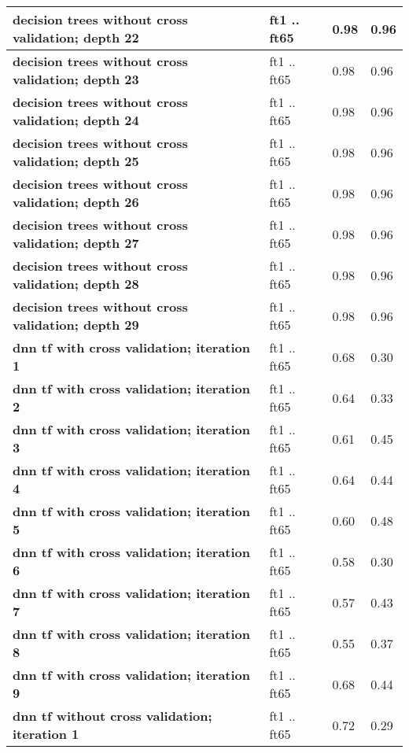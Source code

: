 \begin{tabular}{|l|p{1.2in}|p{0.9in}|p{0.9in}|}
     \hline
      \textbf{ decision trees without cross validation; depth 22 } &  ft1 .. ft65  &  0.98  &  0.96 \\
     \hline
      \textbf{ decision trees without cross validation; depth 23 } &  ft1 .. ft65  &  0.98  &  0.96 \\
     \hline
      \textbf{ decision trees without cross validation; depth 24 } &  ft1 .. ft65  &  0.98  &  0.96 \\
     \hline
      \textbf{ decision trees without cross validation; depth 25 } &  ft1 .. ft65  &  0.98  &  0.96 \\
     \hline
      \textbf{ decision trees without cross validation; depth 26 } &  ft1 .. ft65  &  0.98  &  0.96 \\
     \hline
      \textbf{ decision trees without cross validation; depth 27 } &  ft1 .. ft65  &  0.98  &  0.96 \\
     \hline
      \textbf{ decision trees without cross validation; depth 28 } &  ft1 .. ft65  &  0.98  &  0.96 \\
     \hline
      \textbf{ decision trees without cross validation; depth 29 } &  ft1 .. ft65  &  0.98  &  0.96 \\
     \hline
      \textbf{ dnn tf with cross validation; iteration 1 } &  ft1 .. ft65  &  0.68  &  0.30 \\
     \hline
      \textbf{ dnn tf with cross validation; iteration 2 } &  ft1 .. ft65  &  0.64  &  0.33 \\
     \hline
      \textbf{ dnn tf with cross validation; iteration 3 } &  ft1 .. ft65  &  0.61  &  0.45 \\
     \hline
      \textbf{ dnn tf with cross validation; iteration 4 } &  ft1 .. ft65  &  0.64  &  0.44 \\
     \hline
      \textbf{ dnn tf with cross validation; iteration 5 } &  ft1 .. ft65  &  0.60  &  0.48 \\
     \hline
      \textbf{ dnn tf with cross validation; iteration 6 } &  ft1 .. ft65  &  0.58  &  0.30 \\
     \hline
      \textbf{ dnn tf with cross validation; iteration 7 } &  ft1 .. ft65  &  0.57  &  0.43 \\
     \hline
      \textbf{ dnn tf with cross validation; iteration 8 } &  ft1 .. ft65  &  0.55  &  0.37 \\
     \hline
      \textbf{ dnn tf with cross validation; iteration 9 } &  ft1 .. ft65  &  0.68  &  0.44 \\
     \hline
      \textbf{ dnn tf without cross validation; iteration 1 } &  ft1 .. ft65  &  0.72  &  0.29 \\

\end{tabular}
